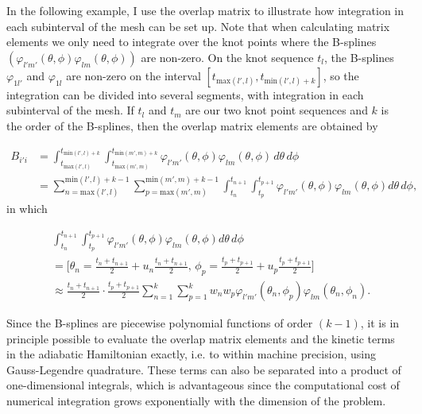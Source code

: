 In the following example, I use the overlap matrix to illustrate how integration in each subinterval of the mesh can be set up. Note that when calculating matrix elements we only need to integrate over the knot points where the B-splines $(\varphi_{l'm'}(\theta,\phi)\varphi_{lm}(\theta,\phi))$ are non-zero. On the knot sequence $t_{l}$, the B-splines $\varphi_{1l'}$ and $\varphi_{1l}$ are non-zero on the interval $[t_{\text{max}(l',l)},t_{\text{min}(l',l)+k}]$, so the integration can be divided into several segments, with integration in each subinterval of the mesh. If $t_{l}$ and $t_{m}$ are our two knot point sequences and $k$ is the order of the B-splines, then the overlap matrix elements are obtained by

\begin{equation}
\begin{aligned}
B_{i'i} &= \int_{t_{\text{max}(l',l)}}^{t_{\text{min}(l',l)+k}} \int_{t_{\text{max}(m',m)}}^{t_{\text{min}(m',m)+k}} \varphi_{l'm'}(\theta,\phi)\varphi_{lm}(\theta,\phi)\,d\theta\,d\phi \\
&= \sum_{n={\text{max}(l',l)}}^{\text{min}(l',l)+k-1} \sum_{p={\text{max}(m',m)}}^{\text{min}(m',m)+k-1} \int_{t_{n}}^{t_{n+1}} \int_{t_{p}}^{t_{p+1}} \varphi_{l'm'}(\theta,\phi) \varphi_{lm}(\theta,\phi) d\theta\,d\phi,
\end{aligned}
\end{equation}
in which

\begin{equation}
\begin{aligned}
&\int_{t_{n}}^{t_{n+1}} \int_{t_{p}}^{t_{p+1}} \varphi_{l'm'}(\theta,\phi) \varphi_{lm}(\theta,\phi) d\theta\,d\phi\,\\
&=\bigg[\theta_n = \frac{t_n + t_{n+1}}{2} + u_n\frac{t_n + t_{n+1}}{2}, \, \phi_p = \frac{t_p + t_{p+1}}{2} + u_p\frac{t_p + t_{p+1}}{2}\bigg]\\
&\approx \frac{t_n + t_{n+1}}{2} \cdot \frac{t_p + t_{p+1}}{2} \sum_{n=1}^{k}\sum_{p=1}^{k}w_n w_p \varphi_{l'm'}(\theta_n,\phi_p) \varphi_{lm}(\theta_n,\phi_n).
\end{aligned}
\end{equation}

Since the B-splines are piecewise polynomial functions of order $(k-1)$, it is in principle possible to evaluate the overlap matrix elements and the kinetic terms in the adiabatic Hamiltonian exactly, i.e. to within machine precision, using Gauss-Legendre quadrature. These terms can also be separated into a product of one-dimensional integrals, which is advantageous since the computational cost of numerical integration grows exponentially with the dimension of the problem.

